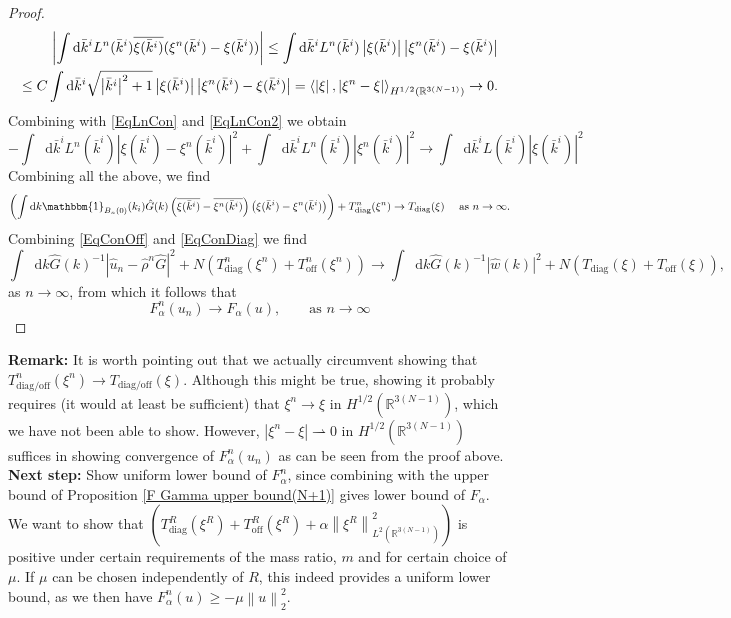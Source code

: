 \documentclass[a4paper,11pt]{article}
\newcommand{\norm}[1]{\left\lVert #1 \right\rVert}
\newcommand{\abs}[1]{\left\lvert #1 \right\rvert}
\newcommand*\diff{\mathop{}\!\mathrm{d}}
\newcommand{\R}{\mathbb{R}}
\numberwithin{equation}{section}
\begin{document}
\begin{proof}
\begin{equation}
\begin{aligned}
\abs{\int\diff \bar{k}^i L^n(\bar{k}^i)\overline{\xi(\bar{k}^i)}(\xi^n(\bar{k}^i)-\xi(\bar{k}^i))}\leq\int\diff \bar{k}^i L^n(\bar{k}^i)\abs{\xi(\bar{k}^i)}\abs{\xi^n(\bar{k}^i)-\xi(\bar{k}^i)}\\\leq C\int\diff \bar{k}^i\sqrt{\abs{\bar{k}^i}^2+1}\abs{\xi(\bar{k}^i)}\abs{\xi^n(\bar{k}^i)-\xi(\bar{k}^i)}=\braket{\abs{\xi},\abs{\xi^n-\xi}}_{H^{1/2}(\R^{3(N-1)})}\to0.
\end{aligned}
\end{equation}
Combining with \eqref{EqLnCon} and \eqref{EqLnCon2} we obtain \begin{equation}
-\int\diff\bar{k}^iL^n(\bar{k}^i)\left\lvert\xi(\bar{k}^i)-\xi^n(\bar{k}^i)\right\rvert^2+\int\diff \bar{k}^i L^n(\bar{k}^i)\abs{\xi^n(\bar{k}^i)}^2\to\int\diff \bar{k}^i L(\bar{k}^i)\abs{\xi(\bar{k}^i)}^2
\end{equation}
Combining all the above, we find \begin{equation}\label{EqConDiag}
\left(\int\diff k\mathbbm{1}_{B_n(0)}(k_i)\hat{G}(k)\left(\overline{\xi(\bar{k}^i)}-\overline{\xi^n(\bar{k}^i)}\right)\left(\xi(\bar{k}^i)-\xi^n(\bar{k}^i)\right)\right)+T_{\text{diag}}^n(\xi^n)\to T_{\text{diag}}(\xi)\quad\text{ as }n\to\infty.
\end{equation}
Combining \eqref{EqConOff} and \eqref{EqConDiag} we find \begin{equation}
\int\diff k \hat{G}(k)^{-1}\abs{\hat{u}_n-\hat{\rho}^n\hat{G}}^2+N(T_{\text{diag}}^n(\xi^n)+T_{\text{off}}^n(\xi^n))\to \int\diff k \hat{G}(k)^{-1}\abs{\hat{w}(k)}^2+N(T_{\text{diag}}(\xi)+T_{\text{off}}(\xi)),
\end{equation}
as $ n\to\infty $, from which it follows that \begin{equation}
F^n_\alpha(u_n)\to F_\alpha(u),\qquad\text{as }n\to\infty
\end{equation}
	\end{proof}
	\textbf{Remark:} It is worth pointing out that we actually circumvent showing that $ T^n_{\text{diag}/\text{off}}(\xi^n)\to T_{\text{diag}/\text{off}}(\xi) $. Although this might be true, showing it probably requires (it would at least be sufficient) that $ \xi^n\to\xi $ in $ H^{1/2}(\R^{3(N-1)}) $, which we have not been able to show. However, $ \abs{\xi^n-\xi}\rightharpoonup0 $ in $ H^{1/2}(\R^{3(N-1)}) $ suffices in showing convergence of $ F_\alpha^n(u_n) $ as can be seen from the proof above.\\
	\textbf{Next step:}
Show uniform lower bound of $ F^n_\alpha $, since combining with the upper bound of Proposition \ref{F Gamma upper bound(N+1)} gives lower bound of $ F_\alpha $. We want to show that $ \left(T^R_{\text{diag}}(\xi^R)+T^R_{\text{off}}(\xi^R)+\alpha\norm{\xi^R}_{L^2(\R^{3(N-1)})}^2\right) $ is positive under certain requirements of the mass ratio, $ m $ and for certain choice of $ \mu $. If $ \mu $ can be chosen independently of $ R $, this indeed provides a uniform lower bound, as we then have $ F_\alpha^n(u)\geq-\mu\norm{u}_2^2 $.\\
\end{document}

